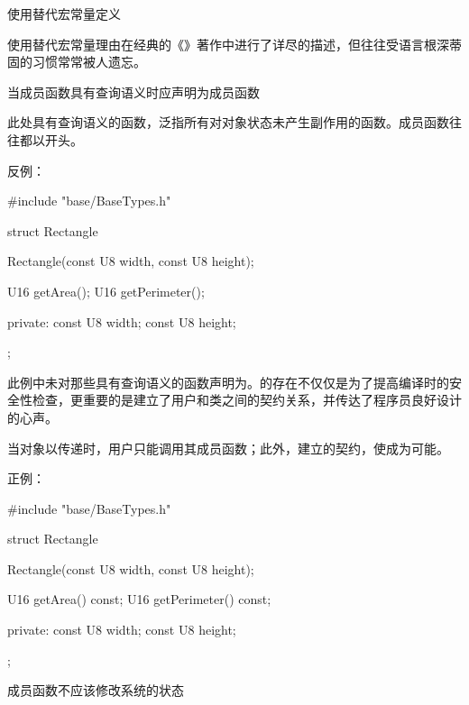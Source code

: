 \begin{content}

\begin{regulation}
使用替代宏常量定义
\end{regulation}

使用替代宏常量理由在经典的《》著作中进行了详尽的描述，但往往受\clang{}语言根深蒂固的习惯常常被人遗忘。

\begin{regulation}
当成员函数具有查询语义时应声明为成员函数
\end{regulation}

此处具有查询语义的函数，泛指所有对对象状态未产生副作用的函数。成员函数往往都以开头。

反例：
\begin{leftbar}
\begin{c++}
#include "base/BaseTypes.h"

struct Rectangle
{
    Rectangle(const U8 width, const U8 height);

    U16 getArea();
    U16 getPerimeter();

private:
    const U8 width;
    const U8 height;
};
\end{c++}
\end{leftbar}

此例中未对那些具有查询语义的函数声明为。的存在不仅仅是为了提高编译时的安全性检查，更重要的是建立了用户和类之间的契约关系，并传达了程序员良好设计的心声。

当对象以传递时，用户只能调用其成员函数；此外，建立的契约，使成为可能。

正例：
\begin{leftbar}
\begin{c++}
#include "base/BaseTypes.h"

struct Rectangle
{
    Rectangle(const U8 width, const U8 height);

    U16 getArea() const;
    U16 getPerimeter() const;

private:
    const U8 width;
    const U8 height;
};
\end{c++}
\end{leftbar}

\begin{regulation}
成员函数不应该修改系统的状态
\end{regulation}


\end{content}
